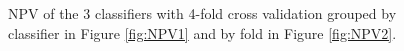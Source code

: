 \documentclass[11pt]{article}
\begin{document}
	
	\begin{figure}[H]%
		\centering
		\caption{\footnotesize NPV of the 3 classifiers with 4-fold cross validation grouped by classifier in Figure \ref{fig:NPV1}  and  by fold in Figure \ref{fig:NPV2}. }
		\label{fig:RealNPV}
	\end{figure}
\end{document}
